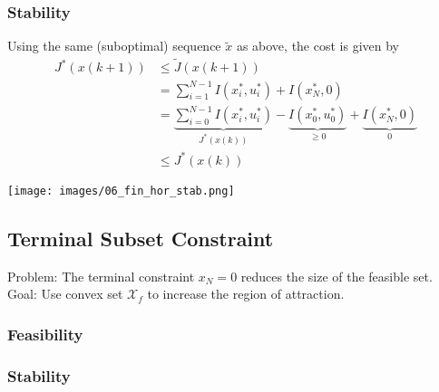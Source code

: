 \subsubsection{Stability}
Using the same (suboptimal) sequence $\widetilde{x}$ as above, the cost is given by
\begin{align*}
    J^*(x(k+1)) & \leq \widetilde{J}(x(k+1))                                                                                                         \\
                & = \sum_{i=1}^{N-1} I(x_i^*, u_i^*) + I(x_N^*, 0)                                                                                   \\
                & =\underbrace{\sum_{i=0}^{N-1} I(x_i^*, u_i^*)}_{J^*(x(k))} - \underbrace{I(x_0^*, u_0^*)}_{\geq 0}  + \underbrace{I(x_N^*, 0)}_{0} \\
                & \leq J^*(x(k))
\end{align*}
\begin{center}
    \texttt{[image: images/06\_fin\_hor\_stab.png]}
\end{center}

\subsection{Terminal Subset Constraint}
Problem: The terminal constraint $x_N = 0$ reduces the size of the feasible set. Goal: Use convex set $\mathcal{X}_f$ to increase the region of attraction.
\subsubsection{Feasibility}

\subsubsection{Stability}